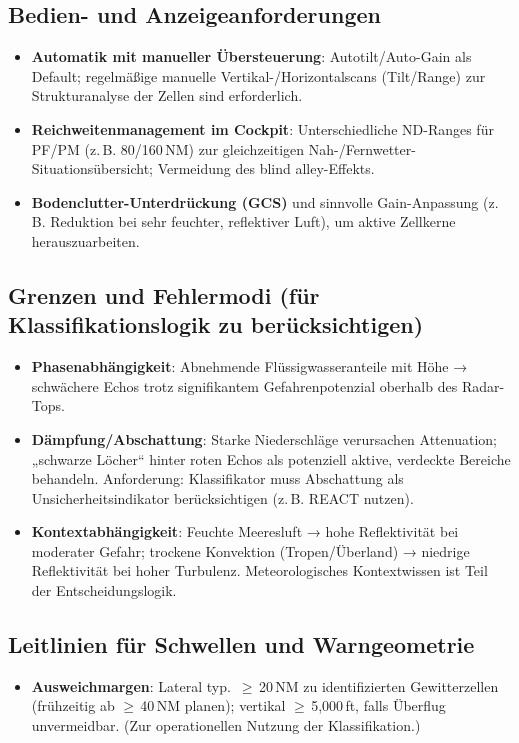 \subsection{Bedien- und Anzeigeanforderungen}
\begin{itemize}
  \item \textbf{Automatik mit manueller Übersteuerung}: Autotilt/Auto-Gain als Default; regelmäßige manuelle Vertikal-/Horizontalscans (Tilt/Range) zur Strukturanalyse der Zellen sind erforderlich.
  \item \textbf{Reichweitenmanagement im Cockpit}: Unterschiedliche ND-Ranges für PF/PM (z.\,B. 80/160\,NM) zur gleichzeitigen Nah-/Fernwetter-Situationsübersicht; Vermeidung des blind alley-Effekts.
  \item \textbf{Bodenclutter-Unterdrückung (GCS)} und sinnvolle Gain-Anpassung (z.\,B. Reduktion bei sehr feuchter, reflektiver Luft), um aktive Zellkerne herauszuarbeiten.
\end{itemize}

\subsection{Grenzen und Fehlermodi (für Klassifikationslogik zu berücksichtigen)}
\begin{itemize}
  \item \textbf{Phasenabhängigkeit}: Abnehmende Flüssigwasseranteile mit Höhe → schwächere Echos trotz signifikantem Gefahrenpotenzial oberhalb des Radar-Tops.
  \item \textbf{Dämpfung/Abschattung}: Starke Niederschläge verursachen Attenuation; „schwarze Löcher“ hinter roten Echos als potenziell aktive, verdeckte Bereiche behandeln. Anforderung: Klassifikator muss Abschattung als Unsicherheitsindikator berücksichtigen (z.\,B. REACT nutzen).
  \item \textbf{Kontextabhängigkeit}: Feuchte Meeresluft → hohe Reflektivität bei moderater Gefahr; trockene Konvektion (Tropen/Überland) → niedrige Reflektivität bei hoher Turbulenz. Meteorologisches Kontextwissen ist Teil der Entscheidungslogik.
\end{itemize}

\subsection{Leitlinien für Schwellen und Warngeometrie}
\begin{itemize}
  \item \textbf{Ausweichmargen}: Lateral typ.\ $\geq$\,20\,NM zu identifizierten Gewitterzellen (frühzeitig ab $\geq$\,40\,NM planen); vertikal $\geq$\,5{,}000\,ft, falls Überflug unvermeidbar. (Zur operationellen Nutzung der Klassifikation.)
\end{itemize}

